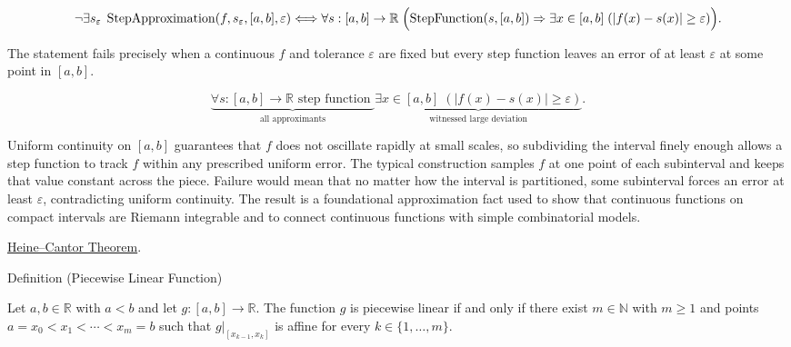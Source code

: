 \begin{remark*}
\[
\neg\exists s_\varepsilon\;
\operatorname{StepApproximation}(f,s_\varepsilon,[a,b],\varepsilon)
\Longleftrightarrow
\forall s:[a,b]\to\mathbb{R}\;
\Bigl(\operatorname{StepFunction}(s,[a,b]) \Rightarrow
\exists x\in[a,b]\;(|f(x)-s(x)|\ge\varepsilon)\Bigr).
\]
\end{remark*}

\begin{remark*}
The statement fails precisely when a continuous $f$ and tolerance $\varepsilon$ are fixed but every step function leaves an error of at least $\varepsilon$ at some point in $[a,b]$.
\end{remark*}

\begin{remark*}
\[
\underbrace{\forall s:[a,b]\to\mathbb{R} \text{ step function }}_{\text{all approximants}}
\underbrace{\exists x\in[a,b]\;(|f(x)-s(x)|\ge\varepsilon)}_{\text{witnessed large deviation}}.
\]
\end{remark*}

\begin{remark*}[Interpretation]
Uniform continuity on $[a,b]$ guarantees that $f$ does not oscillate rapidly at small scales, so subdividing the interval finely enough allows a step function to track $f$ within any prescribed uniform error. The typical construction samples $f$ at one point of each subinterval and keeps that value constant across the piece. Failure would mean that no matter how the interval is partitioned, some subinterval forces an error at least $\varepsilon$, contradicting uniform continuity. The result is a foundational approximation fact used to show that continuous functions on compact intervals are Riemann integrable and to connect continuous functions with simple combinatorial models.
\end{remark*}

\begin{remark*}[Dependencies]
\hyperref[thm:heine-cantor]{Heine--Cantor Theorem}.
\end{remark*}


\begin{definitionbox}{Definition (Piecewise Linear Function)}
\begin{definition}
\label{def:piecewise-linear-function}
Let $a,b \in \mathbb{R}$ with $a<b$ and let $g:[a,b]\to\mathbb{R}$.
The function $g$ is piecewise linear if and only if there exist
$m \in \mathbb{N}$ with $m \ge 1$ and points
$a=x_0<x_1<\cdots<x_m=b$ such that $g|_{[x_{k-1},x_k]}$ is affine
for every $k\in\{1,\ldots,m\}$.
\end{definition}
\end{definitionbox}

